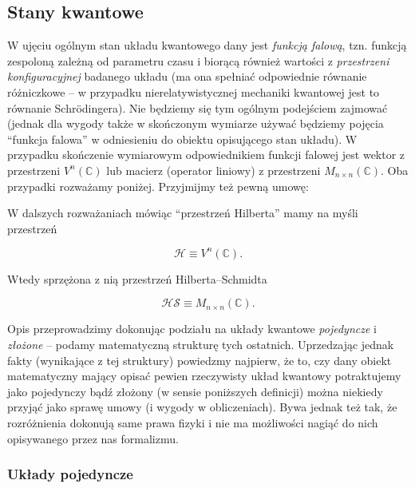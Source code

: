 \subsection{Stany kwantowe}

W ujęciu ogólnym stan układu kwantowego dany jest \textit{funkcją falową}, tzn. funkcją zespoloną zależną od parametru czasu i biorącą również wartości z \textit{przestrzeni konfiguracyjnej} badanego układu (ma ona spełniać odpowiednie równanie różniczkowe -- w przypadku nierelatywistycznej mechaniki kwantowej jest to równanie Schr\"{o}dingera). Nie będziemy się tym ogólnym podejściem zajmować (jednak dla wygody także w skończonym wymiarze używać będziemy pojęcia ``funkcja falowa'' w odniesieniu do obiektu opisującego stan układu). W przypadku skończenie wymiarowym odpowiednikiem funkcji falowej jest wektor z przestrzeni $V ^ n(\mathbb{C})$ lub macierz (operator liniowy) z przestrzeni $M_{n \times n}(\mathbb{C})$. Oba przypadki rozważamy poniżej. Przyjmijmy też pewną umowę:

\begin{convention}
    \label{convention:space}
    W dalszych rozważaniach mówiąc ``przestrzeń Hilberta'' mamy na myśli przestrzeń

    \begin{equation}
        \label{equation:states}
        \mathcal{H} \equiv V^n(\mathbb{C}).
    \end{equation}

    Wtedy sprzężona z nią przestrzeń Hilberta--Schmidta

    \begin{equation}
        \label{equation:operators}
        \mathcal{HS} \equiv M_{n \times n}(\mathbb{C}).
    \end{equation}
\end{convention}

Opis przeprowadzimy dokonując podziału na układy kwantowe \textit{pojedyncze} i \textit{złożone} -- podamy matematyczną strukturę tych ostatnich. Uprzedzając jednak fakty (wynikające z tej struktury) powiedzmy najpierw, że to, czy dany obiekt matematyczny mający opisać pewien rzeczywisty układ kwantowy potraktujemy jako pojedynczy bądź złożony (w sensie poniższych definicji) można niekiedy przyjąć jako sprawę umowy (i wygody w obliczeniach). Bywa jednak też tak, że rozróżnienia dokonują same prawa fizyki i nie ma możliwości nagiąć do nich opisywanego przez nas formalizmu.

\subsubsection{Układy pojedyncze}

